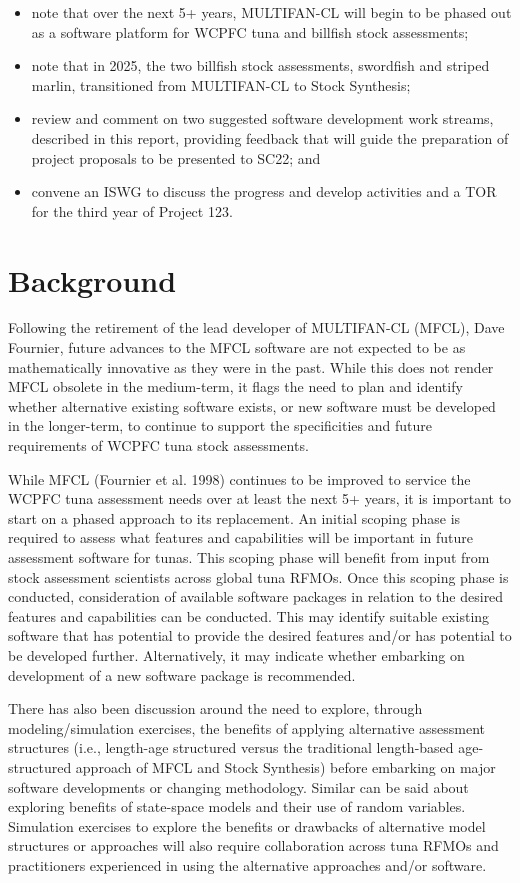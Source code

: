 \documentclass{SCreport}
\begin{document}
\begin{itemize}
  \item note that over the next 5+ years, MULTIFAN-CL will begin to be phased
  out as a software platform for WCPFC tuna and billfish stock assessments;
  \item note that in 2025, the two billfish stock assessments, swordfish and
  striped marlin, transitioned from MULTIFAN-CL to Stock Synthesis;
  \item review and comment on two suggested software development work streams,
  described in this report, providing feedback that will guide the preparation
  of project proposals to be presented to SC22; and
  \item convene an ISWG to discuss the progress and develop activities and a TOR
  for the third year of Project 123.
\end{itemize}

\section{Background}

Following the retirement of the lead developer of MULTIFAN-CL (MFCL), Dave
Fournier, future advances to the MFCL software are not expected to be as
mathematically innovative as they were in the past. While this does not render
MFCL obsolete in the medium-term, it flags the need to plan and identify whether
alternative existing software exists, or new software must be developed in the
longer-term, to continue to support the specificities and future requirements of
WCPFC tuna stock assessments.

While MFCL (Fournier et al. 1998) continues to be improved to service the WCPFC
tuna assessment needs over at least the next 5+ years, it is important to start
on a phased approach to its replacement. An initial scoping phase is required to
assess what features and capabilities will be important in future assessment
software for tunas. This scoping phase will benefit from input from stock
assessment scientists across global tuna RFMOs. Once this scoping phase is
conducted, consideration of available software packages in relation to the
desired features and capabilities can be conducted. This may identify suitable
existing software that has potential to provide the desired features and/or has
potential to be developed further. Alternatively, it may indicate whether
embarking on development of a new software package is recommended.

There has also been discussion around the need to explore, through
modeling/simulation exercises, the benefits of applying alternative assessment
structures (i.e., length-age structured versus the traditional length-based
age-structured approach of MFCL and Stock Synthesis) before embarking on major
software developments or changing methodology. Similar can be said about
exploring benefits of state-space models and their use of random variables.
Simulation exercises to explore the benefits or drawbacks of alternative model
structures or approaches will also require collaboration across tuna RFMOs and
practitioners experienced in using the alternative approaches and/or software.
\end{document}
